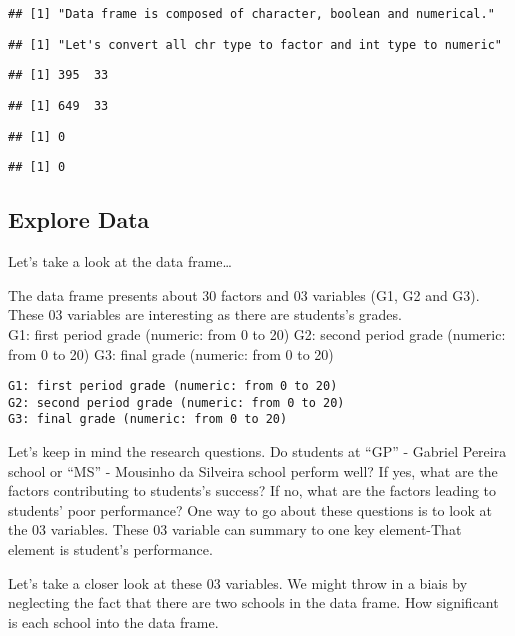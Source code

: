\documentclass[
]{article}
\begin{document}
\begin{verbatim}
## [1] "Data frame is composed of character, boolean and numerical."
\end{verbatim}

\begin{verbatim}
## [1] "Let's convert all chr type to factor and int type to numeric"
\end{verbatim}

\begin{verbatim}
## [1] 395  33
\end{verbatim}

\begin{verbatim}
## [1] 649  33
\end{verbatim}

\begin{verbatim}
## [1] 0
\end{verbatim}

\begin{verbatim}
## [1] 0
\end{verbatim}

\hypertarget{explore-data}{%
\subsection{Explore Data}\label{explore-data}}

Let's take a look at the data frame\ldots{}

The data frame presents about 30 factors and 03 variables (G1, G2 and
G3). These 03 variables are interesting as there are students's
grades.\\
G1: first period grade (numeric: from 0 to 20) G2: second period grade
(numeric: from 0 to 20) G3: final grade (numeric: from 0 to 20)

\begin{verbatim}
G1: first period grade (numeric: from 0 to 20)
G2: second period grade (numeric: from 0 to 20)
G3: final grade (numeric: from 0 to 20)
\end{verbatim}

Let's keep in mind the research questions. Do students at ``GP'' -
Gabriel Pereira school or ``MS'' - Mousinho da Silveira school perform
well? If yes, what are the factors contributing to students's success?
If no, what are the factors leading to students' poor performance? One
way to go about these questions is to look at the 03 variables. These 03
variable can summary to one key element-That element is student's
performance.

Let's take a closer look at these 03 variables. We might throw in a
biais by neglecting the fact that there are two schools in the data
frame. How significant is each school into the data frame.
\end{document}
